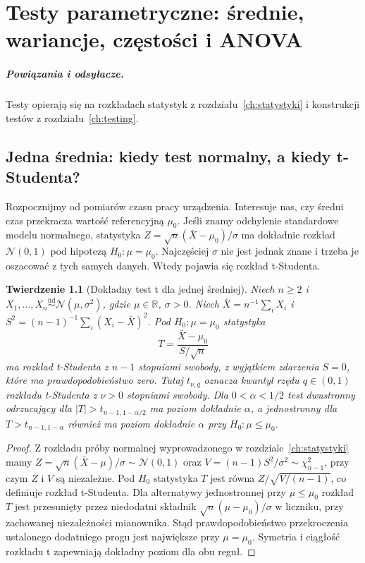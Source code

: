 \documentclass[11pt,a4paper,oneside]{report}
\numberwithin{equation}{chapter}
\theoremstyle{plain}
\newtheorem{twierdzenie}{Twierdzenie}[chapter]
\theoremstyle{definition}
\theoremstyle{remark}
\newcommand{\R}{\mathbb R}
\newcommand{\Normal}{\mathcal N}
\newcommand{\iid}{\mathrel{\overset{\mathrm{iid}}\sim}}
\begin{document}
\chapter{Testy parametryczne: średnie, wariancje, częstości i ANOVA}
\label{ch:parametric-tests}
\paragraph{Powiązania i odsyłacze.} Testy opierają się na rozkładach statystyk z rozdziału~\ref{ch:statystyki} i konstrukcji testów z rozdziału~\ref{ch:testing}.


\section{Jedna średnia: kiedy test normalny, a kiedy t-Studenta?}
Rozpocznijmy od pomiarów czasu pracy urządzenia. Interesuje nas,
czy średni czas przekracza wartość referencyjną $\mu_0$.
Jeśli znamy odchylenie standardowe modelu normalnego, statystyka
$Z=\sqrt n(\bar X-\mu_0)/\sigma$ ma dokładnie rozkład
$\Normal(0,1)$ pod hipotezą $H_0:\mu=\mu_0$.
Najczęściej $\sigma$ nie jest jednak znane i trzeba je oszacować
z tych samych danych. Wtedy pojawia się rozkład t-Studenta.

\begin{twierdzenie}[Dokładny test t dla jednej średniej]
\label{thm:one-sample-t}
Niech $n\ge2$ i $X_1,\ldots,X_n\iid\Normal(\mu,\sigma^2)$,
gdzie $\mu\in\R$, $\sigma>0$. Niech
$\bar X=n^{-1}\sum_iX_i$ i
$S^2=(n-1)^{-1}\sum_i(X_i-\bar X)^2$.
Pod $H_0:\mu=\mu_0$ statystyka
\[
 T=\frac{\bar X-\mu_0}{S/\sqrt n}
\]
ma rozkład t-Studenta z $n-1$ stopniami swobody, z wyjątkiem
zdarzenia $S=0$, które ma prawdopodobieństwo zero.
Tutaj $t_{\nu,q}$ oznacza kwantyl rzędu $q\in(0,1)$
rozkładu t-Studenta z $\nu>0$ stopniami swobody.
Dla $0<\alpha<1/2$ test dwustronny odrzucający dla
$|T|>t_{n-1,1-\alpha/2}$ ma poziom dokładnie $\alpha$,
a jednostronny dla $T>t_{n-1,1-\alpha}$ również ma
poziom dokładnie $\alpha$ przy $H_0:\mu\le\mu_0$.
\end{twierdzenie}
\begin{proof}
Z rozkładu próby normalnej wyprowadzonego w
rozdziale~\ref{ch:statystyki} mamy
$Z=\sqrt n(\bar X-\mu)/\sigma\sim\Normal(0,1)$ oraz
$V=(n-1)S^2/\sigma^2\sim\chi^2_{n-1}$, przy czym
$Z$ i $V$ są niezależne. Pod $H_0$ statystyka $T$ jest
równa $Z/\sqrt{V/(n-1)}$, co definiuje rozkład t-Studenta.
Dla alternatywy jednostronnej przy $\mu\le\mu_0$
rozkład $T$ jest przesunięty przez niedodatni składnik
$\sqrt n(\mu-\mu_0)/\sigma$ w liczniku, przy zachowanej
niezależności mianownika. Stąd prawdopodobieństwo przekroczenia
ustalonego dodatniego progu jest największe przy $\mu=\mu_0$.
Symetria i ciągłość rozkładu t zapewniają dokładny poziom
dla obu reguł.
\end{proof}
\end{document}
